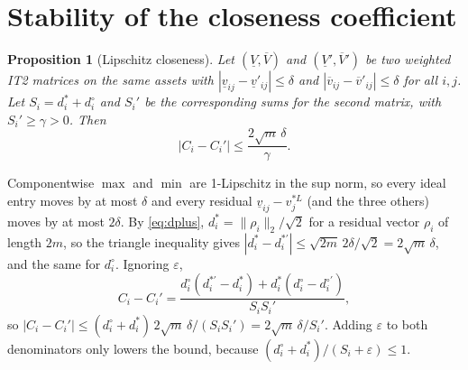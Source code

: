 \documentclass[journal,10pt,twocolumn]{IEEEtran}
\newtheorem{proposition}{Proposition}
\begin{document}
\section{Stability of the closeness coefficient}
\label{sec:theory}
\begin{proposition}[Lipschitz closeness]
\label{p:lip}
Let $(\underline V,\overline V)$ and $(\underline V',\overline V')$ be two weighted IT2 matrices on the same assets with $|\underline v_{ij}-\underline v'_{ij}|\le\delta$ and $|\overline v_{ij}-\overline v'_{ij}|\le\delta$ for all $i,j$. Let $S_i=d_i^{\ast}+d_i^{\circ}$ and $S_i'$ be the corresponding sums for the second matrix, with $S_i'\ge\gamma>0$. Then
\begin{equation}
|C_i-C_i'|\le\frac{2\sqrt m\,\delta}{\gamma}.
\end{equation}
\end{proposition}
\begin{IEEEproof}
Componentwise $\max$ and $\min$ are 1-Lipschitz in the sup norm, so every ideal entry moves by at most $\delta$ and every residual $\underline v_{ij}-v_j^{\ast L}$ (and the three others) moves by at most $2\delta$. By \eqref{eq:dplus}, $d_i^{\ast}=\|\rho_i\|_2/\sqrt2$ for a residual vector $\rho_i$ of length $2m$, so the triangle inequality gives $|d_i^{\ast}-d_i^{\ast\prime}|\le\sqrt{2m}\,2\delta/\sqrt2=2\sqrt m\,\delta$, and the same for $d_i^{\circ}$. Ignoring $\varepsilon$,
\[
C_i-C_i'=\frac{d_i^{\circ}(d_i^{\ast\prime}-d_i^{\ast})+d_i^{\ast}(d_i^{\circ}-d_i^{\circ\prime})}{S_iS_i'},
\]
so $|C_i-C_i'|\le (d_i^{\circ}+d_i^{\ast})\,2\sqrt m\,\delta/(S_iS_i')=2\sqrt m\,\delta/S_i'$. Adding $\varepsilon$ to both denominators only lowers the bound, because $(d_i^{\circ}+d_i^{\ast})/(S_i+\varepsilon)\le1$.
\end{IEEEproof}
\end{document}
